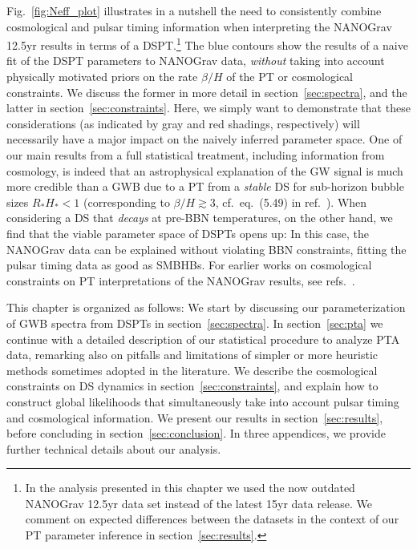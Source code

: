 Fig.~\ref{fig:Neff_plot} illustrates in a nutshell the need to consistently combine cosmological and pulsar timing information when interpreting the \ac{NANOGrav} 12.5yr results in terms of a \ac{DSPT}.\footnote{In the analysis presented in this chapter we used the now outdated \ac{NANOGrav} 12.5yr data set instead of the latest 15yr data release. We comment on expected differences between the datasets in the context of our \ac{PT} parameter inference in section~\ref{sec:results}.} The blue contours show the results of a naive fit of the \ac{DSPT} parameters to \ac{NANOGrav} data, \textit{without} taking into account physically motivated priors on the rate $\beta/H$ of the \ac{PT} or cosmological constraints.   We discuss the former in more detail in section~\ref{sec:spectra}, and the latter in section~\ref{sec:constraints}. Here, we simply want to demonstrate that these considerations (as indicated by gray and red shadings, respectively) will necessarily have a major impact on the naively inferred parameter space. One of our main results from a full statistical treatment, including information from cosmology, is indeed that an astrophysical explanation of the \ac{GW} signal is much more credible than a \ac{GWB} due to a \ac{PT} from a \textit{stable} \ac{DS} for sub-horizon bubble sizes $R_\ast H_\ast < 1$ (corresponding to $\beta/H \gtrsim 3$, cf.~eq.~(5.49) in ref.~\cite{Athron:2023xlk}). When considering a \ac{DS} that \textit{decays} at pre-\ac{BBN} temperatures, on the other hand, we find that the viable parameter space of \acp{DSPT} opens up: In this case, the \ac{NANOGrav} data can be explained without violating \ac{BBN} constraints, fitting the pulsar timing data as good as \acp{SMBHB}. For earlier works on cosmological constraints on \ac{PT} interpretations of the \ac{NANOGrav} results, see refs.~\cite{Nakai:2020oit,Bai:2021ibt,Deng:2023seh}.

This chapter is organized as follows: We start by discussing our parameterization of \ac{GWB} spectra from \acp{DSPT} in section~\ref{sec:spectra}. In section~\ref{sec:pta} we continue with a detailed description of our statistical procedure to analyze \ac{PTA} data, remarking also on pitfalls and limitations of simpler or more heuristic methods sometimes adopted in the literature.  We describe the cosmological constraints on \ac{DS} dynamics  in section~\ref{sec:constraints}, and explain how to construct global likelihoods that simultaneously take into account pulsar timing and cosmological information. We present our results in section~\ref{sec:results}, before concluding in section~\ref{sec:conclusion}. In three appendices, we provide further technical details about our analysis. 

